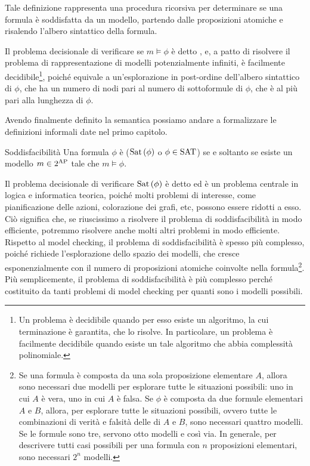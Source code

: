 Tale definizione rappresenta una procedura ricorsiva per determinare se una formula è soddisfatta da un modello, partendo dalle proposizioni atomiche e risalendo l'albero sintattico della formula.

Il problema decisionale di verificare se \(m \models \phi\) è detto , e, a patto di risolvere il problema di rappresentazione di modelli potenzialmente infiniti, è facilmente decidibile\footnote{Un problema è decidibile quando per esso esiste un algoritmo, la cui terminazione è garantita, che lo risolve. In particolare, un problema è facilmente decidibile quando esiste un tale algoritmo che abbia complessità polinomiale.}, poiché equivale a un'esplorazione in post-ordine dell'albero sintattico di \(\phi\), che ha un numero di nodi pari al numero di sottoformule di \(\phi\), che è al più pari alla lunghezza di \(\phi\).

Avendo finalmente definito la semantica possiamo andare a formalizzare le definizioni informali date nel primo capitolo.
\begin{definition}{Soddisfacibilità}
  Una formula \(\phi\) è  (\(\Sat[\phi]\) o \(\phi \in \Sat\)) se e soltanto se esiste un modello \(m\in 2^{\AP}\) tale che \(m \models \phi\).
\end{definition}

Il problema decisionale di verificare \(\Sat[\phi]\) è detto  ed è un problema centrale in logica e informatica teorica, poiché molti problemi di interesse, come pianificazione delle azioni, colorazione dei grafi, etc, possono essere ridotti a esso. 
Ciò significa che, se riuscissimo a risolvere il problema di soddisfacibilità in modo efficiente, potremmo risolvere anche molti altri problemi in modo efficiente.
Rispetto al model checking, il problema di soddisfacibilità è spesso più complesso, poiché richiede l'esplorazione dello spazio dei modelli, che cresce esponenzialmente con il numero di proposizioni atomiche coinvolte nella formula\footnote{Se una formula è composta da una sola proposizione elementare \(A\), allora sono necessari due modelli per esplorare tutte le situazioni possibili: uno in cui \(A\) è vera, uno in cui \(A\) è falsa. Se \(\phi\) è composta da due formule elementari \(A\) e \(B\), allora, per esplorare tutte le situazioni possibili, ovvero tutte le combinazioni di verità e falsità delle di \(A\) e \(B\), sono necessari quattro modelli. Se le formule sono tre, servono otto modelli e così via. In generale, per descrivere tutti casi possibili per una formula con \(n\) proposizioni elementari, sono necessari \(2^{n}\) modelli.}. 
Più semplicemente, il problema di soddisfacibilità è più complesso perché costituito da tanti problemi di model checking per quanti sono i modelli possibili.

